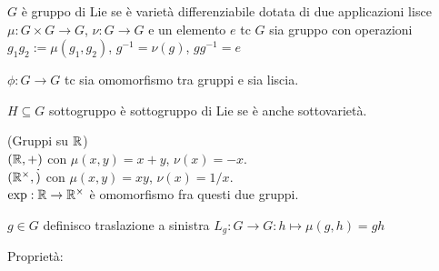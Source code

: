 \begin{definition}
    $G$ è gruppo di Lie se è varietà differenziabile dotata di due
    applicazioni lisce $\mu:G \times G \to G$, $\nu: G \to G$
    e un elemento $e$ tc $G$ sia gruppo con operazioni
    $g_1g_2:=\mu(g_1,g_2)$, $g^{-1}=\nu(g)$, $gg^{-1}=e$
\end{definition}
\begin{definition}
    $\phi:G\to G$ tc sia omomorfismo tra gruppi e sia liscia.
\end{definition}
\begin{definition}
    $H\subseteq G$ sottogruppo è sottogruppo di Lie se è anche
    sottovarietà.
\end{definition}

\begin{ex}(Gruppi su $\mathbb{R}$)\\
    $(\mathbb{R},+)$ con $\mu(x,y)=x+y$, $\nu(x)=-x$.\\
    $(\mathbb{R}^{\times},\dot)$ con $\mu(x,y)=xy$, $\nu(x)=1/x$.\\
    $\exp:\mathbb{R}\to\mathbb{R}^{\times}$ è omomorfismo fra questi due gruppi.
\end{ex}
\begin{definition}
    $g\in G$ definisco traslazione a sinistra $L_g:G\to
    G:h\mapsto\mu(g,h)=gh$
\end{definition}
Proprietà:
